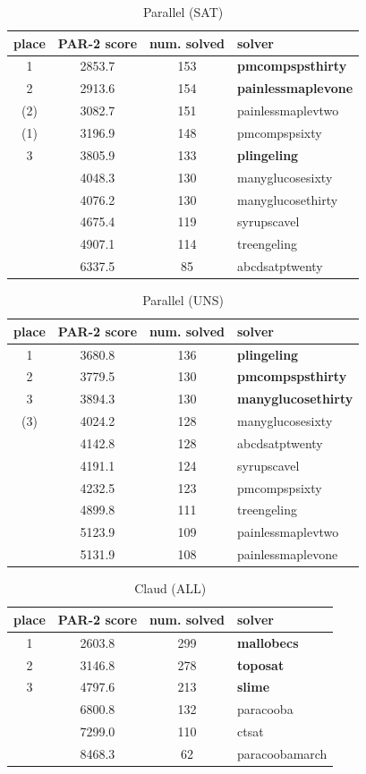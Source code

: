 \documentclass{elsarticle}
\begin{document}
\begin{table}
\caption{Parallel (SAT)}
\label{tab:parallelSAT}
\begin{tabular}{cccl}
place & PAR-2 score & num. solved & solver \\
\hline
 1 & 2853.7 & 153 & {\bf pmcompspsthirty} \\
 2 & 2913.6 & 154 & {\bf painlessmaplevone} \\
(2)& 3082.7 & 151 & painlessmaplevtwo \\
(1)& 3196.9 & 148 & pmcompspsixty \\
 3 & 3805.9 & 133 & {\bf plingeling} \\
   & 4048.3 & 130 & manyglucosesixty \\
   & 4076.2 & 130 & manyglucosethirty \\
   & 4675.4 & 119 & syrupscavel \\
   & 4907.1 & 114 & treengeling \\
   & 6337.5 & 85 & abcdsatptwenty \\
\end{tabular}
\end{table}

\begin{table}
\caption{Parallel (UNS)}
\label{tab:parallelUNS}
\begin{tabular}{cccl}
place & PAR-2 score & num. solved & solver \\
\hline
 1 & 3680.8 & 136 & {\bf plingeling} \\
 2 & 3779.5 & 130 & {\bf pmcompspsthirty} \\
 3 & 3894.3 & 130 & {\bf manyglucosethirty} \\
(3)& 4024.2 & 128 & manyglucosesixty \\
   & 4142.8 & 128 & abcdsatptwenty \\
   & 4191.1 & 124 & syrupscavel \\
   & 4232.5 & 123 & pmcompspsixty \\
   & 4899.8 & 111 & treengeling \\
   & 5123.9 & 109 & painlessmaplevtwo \\
   & 5131.9 & 108 & painlessmaplevone \\
\end{tabular}
\end{table}


\begin{table}
\caption{Claud (ALL)}
\label{tab:claud}
\begin{tabular}{cccl}
place & PAR-2 score & num. solved & solver \\
\hline
 1 & 2603.8 & 299 & {\bf mallobecs} \\
 2 & 3146.8 & 278 & {\bf toposat} \\
 3 & 4797.6 & 213 & {\bf slime} \\
   & 6800.8 & 132 & paracooba \\
   & 7299.0 & 110 & ctsat \\
   & 8468.3 & 62 & paracoobamarch \\
\end{tabular}
\end{table}
\end{document}
